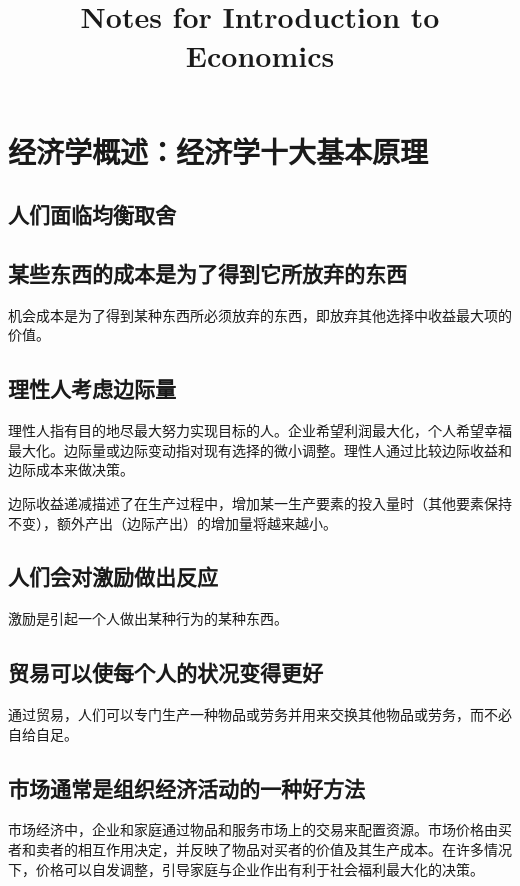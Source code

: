 \documentclass[12pt, a4paper]{article}
\title{Notes for Introduction to Economics}
\author{}
\date{\vspace{-5ex}} %
\begin{document}
\maketitle

\section{经济学概述：经济学十大基本原理}

\subsection{人们面临均衡取舍}

\subsection{某些东西的成本是为了得到它所放弃的东西}
机会成本是为了得到某种东西所必须放弃的东西，即放弃其他选择中收益最大项的价值。

\subsection{理性人考虑边际量}
理性人指有目的地尽最大努力实现目标的人。企业希望利润最大化，个人希望幸福最大化。边际量或边际变动指对现有选择的微小调整。理性人通过比较边际收益和边际成本来做决策。

边际收益递减描述了在生产过程中，增加某一生产要素的投入量时（其他要素保持不变），额外产出（边际产出）的增加量将越来越小。

\subsection{人们会对激励做出反应}
激励是引起一个人做出某种行为的某种东西。

\subsection{贸易可以使每个人的状况变得更好}
通过贸易，人们可以专门生产一种物品或劳务并用来交换其他物品或劳务，而不必自给自足。

\subsection{市场通常是组织经济活动的一种好方法}
市场经济中，企业和家庭通过物品和服务市场上的交易来配置资源。市场价格由买者和卖者的相互作用决定，并反映了物品对买者的价值及其生产成本。在许多情况下，价格可以自发调整，引导家庭与企业作出有利于社会福利最大化的决策。
\end{document}
